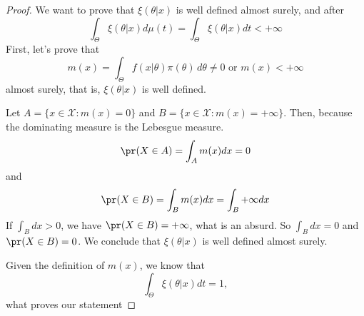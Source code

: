 \begin{proof}
    We want to prove that $\xi(\theta|x)$ is well defined almost
    surely, and after 
    $$
    \int_{\Theta } \xi(\theta|x) d\mu(t) = \int_{\Theta} \xi(\theta|x)dt < + \infty
    $$
    First, let's prove that 
    $$m(x) = \int_{\Theta} f(x|\theta)\pi(\theta) \, d\theta \neq 0 \text{ or } m(x) < + \infty$$ almost surely,
    that is, $\xi(\theta|x)$ is well defined. 
    
    Let $A = \{x \in \mathcal{X}: m(x) = 0\}$ and $B = \{x \in \mathcal{X}:
    m(x) = +\infty\}$. Then, because the dominating measure is the Lebesgue measure. 
    $$
    \pr(X \in A) = \int_A m(x) dx = 0
    $$
    and 
    $$
    \pr(X \in B) = \int_B m(x) dx = \int_B + \infty dx 
    $$
    If $\int_B dx > 0$, we have $\pr(X \in B) = + \infty$, what is an absurd.
    So $\int_B dx = 0$ and $\pr(X \in B) = 0$. We conclude that $\xi(\theta|x)$ is well
    defined almost surely. 

    Given the definition of $m(x)$, we know that
    $$
    \int_{\Theta} \xi(\theta|x)dt = 1,
    $$
    what proves our statement 
\end{proof}